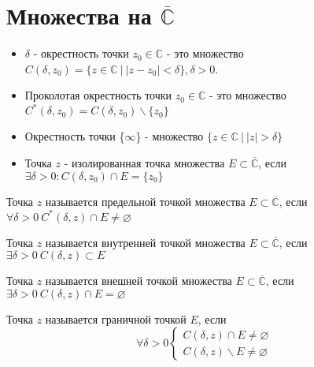 \section{Множества на $\overline{\mathbb{C}}$}

\begin{definition}
    \begin{itemize}
        \item $\delta$ - окрестность точки $z_0 \in \mathbb{C}$ - это множество $C(\delta, z_0) = \{z \in \mathbb{C} \ | \ \left| z - z_0\right| < \delta\}, \delta > 0$.
        \item Проколотая окрестность точки $z_0 \in \mathbb{C}$ - это множество $C^*(\delta, z_0) = C(\delta, z_0) \backslash \{z_0\}$
        \item Окрестность точки \{$\infty$\} - множество $\{z \in \mathbb{C} \ | \ \left| z \right| > \delta\}$
        \item Точка $z$ - изолированная точка множества $E \subset \overline{\mathbb{C}}$, если $\exists \delta > 0: C(\delta, z_0) \cap E = \{z_0\}$
    \end{itemize}
\end{definition}

\begin{definition}
    Точка $z$ называется предельной точкой множества $E \subset \overline{\mathbb{C}}$, если $\forall \delta > 0 \ C^*(\delta, z) \cap E \neq \varnothing$
\end{definition}

\begin{definition}
    Точка $z$ называется внутренней точкой множества $E \subset \overline{\mathbb{C}}$, если $\exists \delta > 0 \ C(\delta, z) \subset E$
\end{definition}

\begin{definition}
    Точка $z$ называется внешней точкой множества $E \subset \overline{\mathbb{C}}$, если $\exists \delta > 0 \ C(\delta, z) \cap E = \varnothing$
\end{definition}

\begin{definition}
    Точка $z$ называется граничной точкой $E$, если 
    \[\forall \delta > 0 \begin{cases}
        C(\delta, z) \cap E \neq \varnothing \\
        C(\delta, z) \backslash E \neq \varnothing
    \end{cases}\]
\end{definition}

